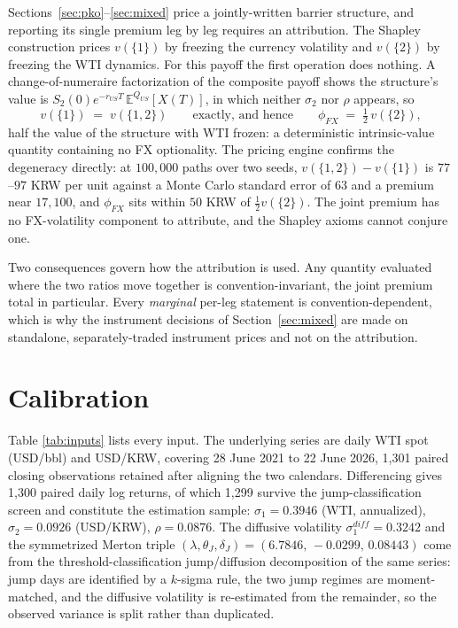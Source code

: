 \documentclass[11pt,a4paper]{article}
\begin{document}
Sections~\ref{sec:pko}--\ref{sec:mixed} price a jointly-written barrier structure, and reporting its single premium leg by leg requires an attribution. The Shapley construction prices $v(\{1\})$ by freezing the currency volatility and $v(\{2\})$ by freezing the WTI dynamics. For this payoff the first operation does nothing. A change-of-numeraire factorization of the composite payoff shows the structure's value is $S_2(0)e^{-r_{US}T}\,\mathbb E^{Q_{US}}[X(T)]$, in which neither $\sigma_2$ nor $\rho$ appears, so
\begin{equation}
v(\{1\}) \;=\; v(\{1,2\}) \qquad\text{exactly, and hence}\qquad \phi_{FX} \;=\; \tfrac12\,v(\{2\}),
\label{eq:degenerate}
\end{equation}
half the value of the structure with WTI frozen: a deterministic intrinsic-value quantity containing no FX optionality. The pricing engine confirms the degeneracy directly: at $100{,}000$ paths over two seeds, $v(\{1,2\})-v(\{1\})$ is $77$--$97$ KRW per unit against a Monte Carlo standard error of $63$ and a premium near $17{,}100$, and $\phi_{FX}$ sits within $50$ KRW of $\tfrac12 v(\{2\})$. The joint premium has no FX-volatility component to attribute, and the Shapley axioms cannot conjure one.

Two consequences govern how the attribution is used. Any quantity evaluated where the two ratios move together is convention-invariant, the joint premium total in particular. Every \emph{marginal} per-leg statement is convention-dependent, which is why the instrument decisions of Section~\ref{sec:mixed} are made on standalone, separately-traded instrument prices and not on the attribution.

\section{Calibration}
\label{sec:data}

Table \ref{tab:inputs} lists every input. The underlying series are daily WTI spot (USD/bbl) and USD/KRW, covering 28 June 2021 to 22 June 2026, 1{,}301 paired closing observations retained after aligning the two calendars. Differencing gives 1{,}300 paired daily log returns, of which 1{,}299 survive the jump-classification screen and constitute the estimation sample: $\sigma_1 = 0.3946$ (WTI, annualized), $\sigma_2 = 0.0926$ (USD/KRW), $\rho = 0.0876$. The diffusive volatility $\sigma_1^{diff}=0.3242$ and the symmetrized Merton triple $(\lambda,\theta_J,\delta_J)=(6.7846,\,-0.0299,\,0.08443)$ come from the threshold-classification jump/diffusion decomposition of the same series: jump days are identified by a $k$-sigma rule, the two jump regimes are moment-matched, and the diffusive volatility is re-estimated from the remainder, so the observed variance is split rather than duplicated.
\end{document}
